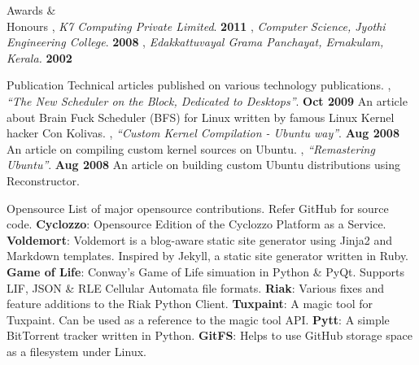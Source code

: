 \documentclass{resume}
\begin{document}

\begin{category}{Awards \&\\ Honours}
  , {\em K7 Computing Private Limited}. \hfill \textbf{2011}
  , {\em Computer Science, Jyothi Engineering College}. \hfill \textbf{2008}
  , {\em Edakkattuvayal Grama Panchayat, Ernakulam, Kerala.} \hfill \textbf{2002}
\end{category}


\begin{category}{Publication}
  \citemnobullet Technical articles published on various technology publications.
  , {\em ``The New Scheduler on the Block, Dedicated to Desktops''}. \hfill \textbf{Oct 2009}
  \citemnobullet An article about Brain Fuck Scheduler (BFS) for Linux written by famous Linux Kernel hacker Con Kolivas.
  , {\em ``Custom Kernel Compilation - Ubuntu way''}. \hfill \textbf{Aug 2008}
  \citemnobullet An article on compiling custom kernel sources on Ubuntu.
  , {\em ``Remastering Ubuntu''}. \hfill \textbf{Aug 2008}
  \citemnobullet An article on building custom Ubuntu distributions using Reconstructor.
\end{category}


\begin{category}{Opensource}
  \citemnobullet List of major opensource contributions. Refer GitHub for source code.
  \citembullet \textbf{Cyclozzo}: Opensource Edition of the Cyclozzo Platform as a Service.
  \citembullet \textbf{Voldemort}: Voldemort is a blog-aware static site generator using Jinja2 
  and Markdown templates. Inspired by Jekyll, a static site generator written in Ruby.
  \citembullet \textbf{Game of Life}: Conway's Game of Life simuation in Python \& PyQt. Supports LIF, JSON \&
  RLE Cellular Automata file formats.
  \citembullet \textbf{Riak}: Various fixes and feature additions to the Riak Python Client.
  \citembullet \textbf{Tuxpaint}: A magic tool for Tuxpaint. Can be used as a reference to the magic tool API.
  \citembullet \textbf{Pytt}: A simple BitTorrent tracker written in Python.
  \citembullet \textbf{GitFS}: Helps to use GitHub storage space as a filesystem under Linux.
\end{category}
\end{document}
